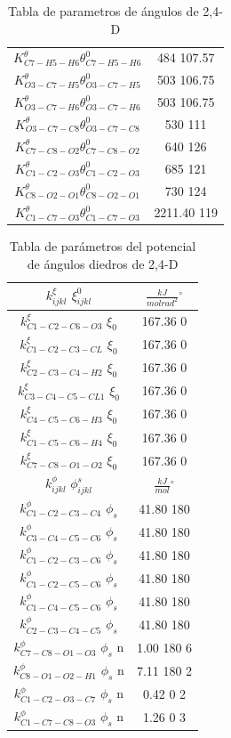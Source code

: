 \begin{table}[!h]
\begin{tabular}{|c|c|}
    $K^{\theta}_{C7-H5-H6} \theta^0_{C7-H5-H6}$& 484 107.57\\
    $K^{\theta}_{O3-C7-H5} \theta^0_{O3-C7-H5}$& 503 106.75\\
    $K^{\theta}_{O3-C7-H6} \theta^0_{O3-C7-H6}$& 503 106.75\\
    $K^{\theta}_{O3-C7-C8} \theta^0_{O3-C7-C8}$& 530 111\\
    $K^{\theta}_{C7-C8-O2} \theta^0_{C7-C8-O2}$& 640 126\\
    $K^{\theta}_{C1-C2-O3} \theta^0_{C1-C2-O3}$& 685 121\\
    $K^{\theta}_{C8-O2-O1} \theta^0_{C8-O2-O1}$& 730 124\\
    $K^{\theta}_{C1-C7-O3} \theta^0_{C1-C7-O3}$& 2211.40 119\\
    \hline
    \end{tabular}
    \caption{Tabla de parametros de ángulos de 2,4-D}
    \label{tab:angulos24D}
\end{table}

\begin{table}[!h]
    \centering
    \begin{tabular}{|c|c|}
    \hline
    $k^{\xi}_{ijkl}$ $\xi^{0}_{ijkl}$ & $\frac{kJ}{molrad^2}$\quad $^{\circ}$ \\
    \hline
    $k^{\xi}_{C1-C2-C6-O3}$ $\xi_{0}$ & 167.36 0\\
    $k^{\xi}_{C1-C2-C3-CL}$ $\xi_{0}$ & 167.36 0\\
    $k^{\xi}_{C2-C3-C4-H2}$ $\xi_{0}$ & 167.36 0\\
    $k^{\xi}_{C3-C4-C5-CL1}$ $\xi_{0}$ & 167.36 0 \\
    $k^{\xi}_{C4-C5-C6-H3}$ $\xi_{0}$ & 167.36 0\\
    $k^{\xi}_{C1-C5-C6-H4}$ $\xi_{0}$ & 167.36 0\\
    $k^{\xi}_{C7-C8-O1-O2}$ $\xi_{0}$ & 167.36 0\\
    \hline
    $k^{\phi}_{ijkl}$ $\phi^s_{ijkl}$ & $\frac{kJ}{mol}$\quad $^{\circ}$\\
    \hline
    $k^{\phi}_{C1-C2-C3-C4}$ $\phi_s$ & 41.80 180\\
    $k^{\phi}_{C3-C4-C5-C6}$ $\phi_s$ & 41.80 180\\
    $k^{\phi}_{C1-C2-C3-C6}$ $\phi_s$ & 41.80 180\\
    $k^{\phi}_{C1-C2-C5-C6}$ $\phi_s$ & 41.80 180\\
    $k^{\phi}_{C1-C4-C5-C6}$ $\phi_s$ & 41.80 180\\
    $k^{\phi}_{C2-C3-C4-C5}$ $\phi_s$ & 41.80 180\\
    $k^{\phi}_{C7-C8-O1-O3}$ $\phi_s$ n & 1.00 180 6\\
    $k^{\phi}_{C8-O1-O2-H1}$ $\phi_s$ n & 7.11 180 2\\
    $k^{\phi}_{C1-C2-O3-C7}$ $\phi_s$ n & 0.42 0 2\\
    $k^{\phi}_{C1-C7-C8-O3}$ $\phi_s$ n & 1.26 0 3\\
    \hline
    \end{tabular}
    \caption{Tabla de parámetros del potencial de ángulos diedros de 2,4-D}
    \label{tab:angulosdih24D}
\end{table}

